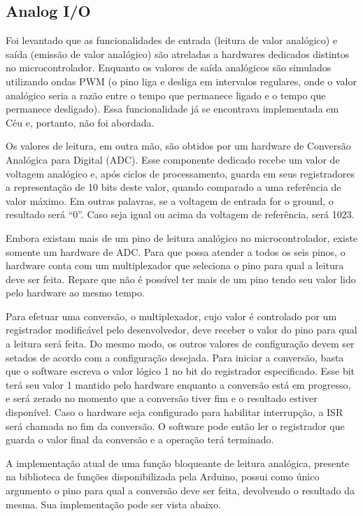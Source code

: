 \documentclass[11pt]{article}
\begin{document}
\subsection{Analog I/O}
\tab Foi levantado que as funcionalidades de entrada (leitura de valor analógico) e saída (emissão de valor analógico) são atreladas a hardwares dedicados distintos no microcontrolador. Enquanto os valores de saída analógicos são simulados utilizando ondas PWM (o pino liga e desliga em intervalos regulares, onde o valor analógico seria a razão entre o tempo que permanece ligado e o tempo que permanece desligado). Essa funcionalidade já se encontrava implementada em Céu e, portanto, não foi abordada.
\par Os valores de leitura, em outra mão, são obtidos por um hardware de Conversão Analógica para Digital (ADC). Esse componente dedicado recebe um valor de voltagem analógico e, após ciclos de processamento, guarda em seus registradores a representação de 10 bits deste valor, quando comparado a uma referência de valor máximo. Em outras palavras, se a voltagem de entrada for o ground, o resultado será “0”. Caso seja igual ou acima da voltagem de referência, será 1023. 
\par Embora existam mais de um pino de leitura analógico no microcontrolador, existe somente um hardware de ADC. Para que possa atender a todos os seis pinos, o hardware conta com um multiplexador que seleciona o pino para qual a leitura deve ser feita. Repare que não é possível ter mais de um pino tendo seu valor lido pelo hardware ao mesmo tempo. 
\par Para efetuar uma conversão, o multiplexador, cujo valor é controlado por um registrador modificável pelo desenvolvedor, deve receber o valor do pino para qual a leitura será feita. Do mesmo modo, os outros valores de configuração devem ser setados de acordo com a configuração desejada. Para iniciar a conversão, basta que o software escreva o valor lógico 1 no bit do registrador especificado. Esse bit terá seu valor 1 mantido pelo hardware enquanto a conversão está em progresso, e será zerado no momento que a conversão tiver fim e o resultado estiver disponível. Caso o hardware seja configurado para habilitar interrupção, a ISR será chamada no fim da conversão. O software pode então ler o registrador que guarda o valor final da conversão e a operação terá terminado.
\par A implementação atual de uma função bloqueante de leitura analógica, presente na biblioteca de funções disponibilizada pela Arduino, possui como único argumento o pino para qual a conversão deve ser feita, devolvendo o resultado da mesma. Sua implementação pode ser vista abaixo.
\end{document}
